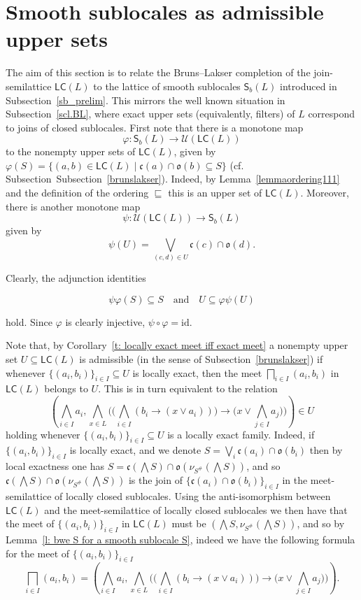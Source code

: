 \documentclass[11pt,a4paper,reqno]{amsart}
\newcommand{\tbigwedge}{\mathop{\textstyle \bigwedge }}%
\newcommand{\tbigsqcap}{\mathop{\textstyle \bigsqcap }}%
\newcommand{\tbigvee}{\mathop{\textstyle \bigvee }}%
\newcommand{\cat}[1]{\ensuremath{\mathsf{#1}}} %
\def\SS{\mathsf{S}}
\def\cl{\mathfrak{c}}
\def\op{\mathfrak{o}}
\theoremstyle{definition}
\theoremstyle{remark}
\newcommand{\ca}[1]{\mathcal{#1}}
\newcommand{\mf}{\mathsf}
\begin{document}
{\section{Smooth sublocales as admissible upper sets}\label{sec.5}


The aim of this section is to relate the Bruns--Lakser completion of the join-semilattice $\mathsf{LC}(L)$ to the lattice of smooth sublocales $\mathsf{S}_b(L)$ introduced in Subsection~\ref{sb_prelim}.  
This mirrors the well known situation in Subsection~\ref{scl.BL}, where exact upper sets (equivalently, filters) of $L$ correspond to joins of closed sublocales. First note that there is a monotone map $$\varphi\colon \SS_b(L)\longrightarrow \ca{U}(\mathsf{LC}(L))$$
to the nonempty upper sets of $\mf{LC}(L)$, given by $\varphi(S)=\{(a,b)\in \cat{LC}(L)\mid \cl(a)\cap\op(b)\subseteq S\}$ (cf. Subsection~Subsection~\ref{brunslakser}). Indeed, by Lemma~\ref{lemmaordering111} and the definition of the ordering $\sqsubseteq$ this is an upper set of $\cat{LC}(L)$. Moreover, there is another monotone map $$\psi\colon \ca{U}(\mathsf{LC}(L))\to\SS_b(L)$$ given by $$\psi(U)=\tbigvee_{(c,d)\in U}\cl(c)\cap\op(d).$$

Clearly, the adjunction identities

$$ \psi\varphi(S)\subseteq S \quad \text{and} \quad U\subseteq  \varphi\psi(U)$$

hold. Since $\varphi$ is clearly injective, $\psi \circ \varphi=\text{id}$.



Note that, by Corollary~\ref{t: locally exact meet iff exact meet} a nonempty upper set $U\subseteq \mathsf{LC}(L)$ is admissible (in the sense of Subsection~\ref{brunslakser}) if whenever $\{(a_i,b_i)\}_{i\in I}\subseteq U$ is locally exact, then the meet $\bigsqcap_{i\in I} (a_i,b_i)$ in $\mathsf{LC}(L)$  belongs to $U$. 
This is in turn equivalent to the relation
$$\left( \tbigwedge_{i\in I} a_i,    \tbigwedge_{x\in L} \biggl(  \big(\tbigwedge _{i\in I} (b_i\to (x\vee a_i)) \big) \to \big( x\vee  \tbigwedge_{j\in I} a_j\bigr) \biggr)\right)\in U$$
holding whenever $\{(a_i,b_i)\}_{i\in I}\subseteq U$ is a locally exact family. Indeed,  if $\{(a_i,b_i)\}_{i\in I}$ is locally exact, and we denote  $S=\tbigvee_i \cl(a_i)\cap \op(b_i)$ then by local exactness   one has $S=\cl(\tbigwedge S)\cap \op(\nu_{S^\#}(\tbigwedge S))$, and so   $\cl(\tbigwedge S)\cap \op(\nu_{S^\#}(\tbigwedge S))$ is the join of $\{\cl(a_i)\cap \op(b_i)\}_{i\in I}$ in  the meet-semilattice of locally closed sublocales. Using the anti-isomorphism between $\mf{LC}(L)$ and the meet-semilattice of locally closed sublocales we then have that the meet of $\{(a_i,b_i)\}_{i\in I}$ in $\mathsf{LC}(L)$ must be $(\tbigwedge S,\nu_{S^\#}(\tbigwedge S))$, and so by Lemma~\ref{l: bwe S for a smooth sublocale S}, indeed we have the following formula for the meet of $\{(a_i,b_i)\}_{i\in I}$
\begin{equation}\label{e: meet of locally exact family}
\tbigsqcap_{i\in I} (a_i,b_i)=\left( \tbigwedge_{i\in I} a_i,    \tbigwedge_{x\in L} \biggl(  \big(\tbigwedge _{i\in I} (b_i\to (x\vee a_i)) \big) \to \big( x\vee  \tbigwedge_{j\in I} a_j\bigr) \biggr)\right).
\end{equation}

}
\end{document}
